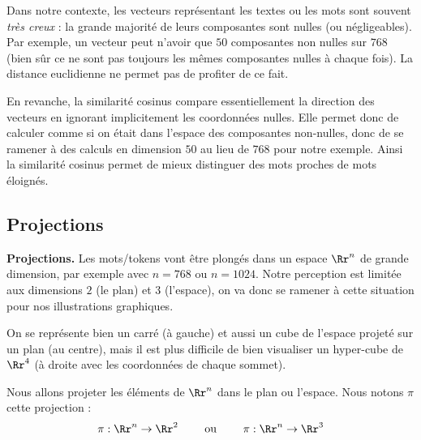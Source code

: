 \documentclass[11pt,class=report,crop=false]{standalone}
\begin{document}
Dans notre contexte, les vecteurs représentant les textes ou les mots sont souvent \emph{très creux} : la grande majorité de leurs composantes sont nulles (ou négligeables). Par exemple, un vecteur peut n’avoir que $50$ composantes non nulles sur $768$ (bien sûr ce ne sont pas toujours les mêmes composantes nulles à chaque fois). La distance euclidienne ne permet pas de profiter de ce fait.

En revanche, la similarité cosinus compare essentiellement la direction des vecteurs en ignorant implicitement les coordonnées nulles. Elle permet donc de calculer comme si on était dans l'espace des composantes non-nulles, donc de se ramener à des calculs en dimension $50$ au lieu de $768$ pour notre exemple. Ainsi la similarité cosinus permet de mieux distinguer des mots proches de mots éloignés.





\subsection{Projections}


\textbf{Projections.}
Les mots/tokens vont être plongés dans un espace $\Rr^n$ de grande dimension, par exemple avec $n=768$ ou $n=1024$. 
Notre perception est limitée aux dimensions $2$ (le plan) et $3$ (l'espace), on va donc se ramener à cette situation pour nos illustrations graphiques.

On se représente bien un carré (à gauche) et aussi un cube de l'espace projeté sur un plan (au centre), mais il est plus difficile de bien visualiser un hyper-cube de $\Rr^4$ (à droite avec les coordonnées de chaque sommet).


\begin{center}
\begin{minipage}{0.25\textwidth}
\end{minipage}
\begin{minipage}{0.3\textwidth}
\end{minipage}	
\begin{minipage}{0.4\textwidth}
\end{minipage} 
\end{center}

Nous allons projeter les éléments de $\Rr^n$ dans le plan ou l'espace.
Nous notons $\pi$ cette projection :
$$\pi : \Rr^n \to \Rr^2 \qquad \text{ ou } \qquad \pi : \Rr^n \to \Rr^3$$
\end{document}
